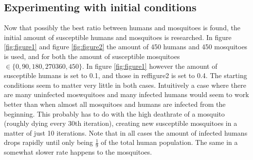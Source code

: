 \documentclass[a4paper]{report}
\begin{document}
\subsection{Experimenting with initial conditions}
Now that possibly the best ratio between humans and mosquitoes is found, 
the initial amount of susceptible humans and mosquitoes is researched.
In figure \ref{fig:figure1} and figure \ref{fig:figure2} the amount of 450
humans and 450 mosquitoes is used, and for both the amount of susceptible mosquitoes
$\in \{0, 90, 180, 270 360, 450\}$. In figure \ref{fig:figure1} however the
amount of susceptible humans is set to 0.1, and those in ref{figure2} is set to
0.4.  The starting conditions seem to matter very little in both cases.
Intuitively a case where there are many uninfected moswquitoes and many infected
humans would seem to work better than when almost all mosquitoes and humans are
infected from the beginning. This probably has to do with the high deathrate of
a mosquito (roughly dying every 30th iteration), creating new susceptible
mosquitoes in a matter of just 10 iterations. Note that in all cases the amount
of infected humans drops rapidly until only being $\frac{1}{9}$ of the total
human population. The same in a somewhat slower rate happens to the mosquitoes.
\end{document}
